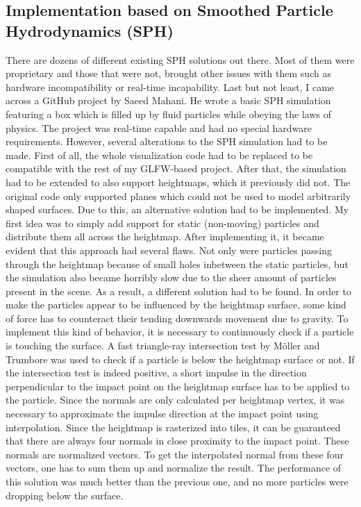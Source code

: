 \documentclass[11pt,a4paper,twoside,openright]{report}
\begin{document}
\subsection{Implementation based on Smoothed Particle Hydrodynamics (SPH)}
There are dozens of different existing SPH solutions out there. Most of them were proprietary and those that were not, brought other issues with them such as hardware incompatibility or real-time incapability. Last but not least, I came across a GitHub project \cite{Mahani} by Saeed Mahani. He wrote a basic SPH simulation featuring a box which is filled up by fluid particles while obeying the laws of physics. The project was real-time capable and had no special hardware requirements. However, several alterations to the SPH simulation had to be made. First of all, the whole visualization code had to be replaced to be compatible with the rest of my GLFW-based project. After that, the simulation had to be extended to also support heightmaps, which it previously did not. The original code only supported planes which could not be used to model arbitrarily shaped surfaces. Due to this, an alternative solution had to be implemented. My first idea was to simply add support for static (non-moving) particles and distribute them all across the heightmap. After implementing it, it became evident that this approach had several flaws. Not only were particles passing through the heightmap because of small holes inbetween the static particles, but the simulation also became horribly slow due to the sheer amount of particles present in the scene. As a result, a different solution had to be found. In order to make the particles appear to be influenced by the heightmap surface, some kind of force has to counteract their tending downwards movement due to gravity. To implement this kind of behavior, it is necessary to continuously check if a particle is touching the surface. A fast triangle-ray intersection test by Möller and Trumbore \cite{moller2005fast} was used to check if a particle is below the heightmap surface or not. If the intersection test is indeed positive, a short impulse in the direction perpendicular to the impact point on the heightmap surface has to be applied to the particle. Since the normals are only calculated per heightmap vertex, it was necessary to approximate the impulse direction at the impact point using interpolation. Since the heightmap is rasterized into tiles, it can be guaranteed that there are always four normals in close proximity to the impact point. These normals are normalized vectors. To get the interpolated normal from these four vectors, one has to sum them up and normalize the result. The performance of this solution was much better than the previous one, and no more particles were dropping below the surface.
\end{document}
